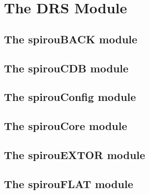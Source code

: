 \chapter{The DRS Module}
\label{ch:the_module}


\section{The spirouBACK module}
\label{ch:the_module:spirouBACK}


\section{The spirouCDB module}
\label{ch:the_module:spirouCDB}


\section{The spirouConfig module}
\label{ch:the_module:spirouConfig}


\section{The spirouCore module}
\label{ch:the_module:spirouCore}


\section{The spirouEXTOR module}
\label{ch:the_module:spirouEXTOR}


\section{The spirouFLAT module}
\label{ch:the_module:spirouFLAT}


